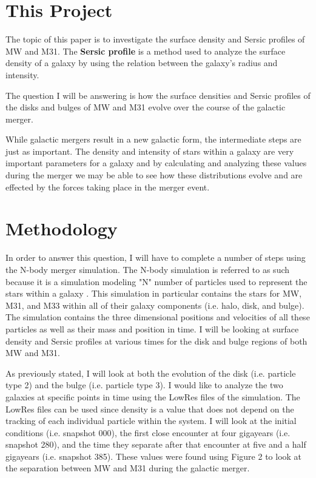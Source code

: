 \documentclass[linenumbers,trackchanges]{aastex7}
\begin{document}
\section{This Project} \label{sec:style}

The topic of this paper is to investigate the surface density and
Sersic profiles of MW and M31. The \textbf{Sersic profile} is a
method used to analyze the surface density of a galaxy by using the
relation between the galaxy's radius and intensity.

The question I will be answering is how the surface densities and
Sersic profiles of the disks and bulges of MW and M31 evolve over the
course of the galactic merger.

While galactic mergers result in a new galactic form, the intermediate
steps are just as important. The density and intensity of stars within
a galaxy are very important parameters for a galaxy and by calculating
and analyzing these values during the merger we may be able to see how
these distributions evolve and are effected by the forces taking place
in the merger event.

\section{Methodology} \label{sec:style}

In order to answer this question, I will have to complete a number of
steps using the N-body merger simulation. The N-body simulation is
referred to as such because it is a simulation modeling "N" number of
particles used to represent the stars within a galaxy
\citep{van_der_Marel_Besla_Cox_Sohn_Anderson_2012}. This simulation in
particular contains the stars for MW, M31, and M33 within all of their
galaxy components (i.e. halo, disk, and bulge). The simulation
contains the three dimensional positions and velocities of all these
particles as well as their mass and position in time. I will be
looking at surface density and Sersic profiles at various times for
the disk and bulge regions of both MW and M31.

As previously stated, I will look at both the evolution of the disk
(i.e. particle type 2) and the bulge (i.e. particle type 3). I would
like to analyze the two galaxies at specific points in time using the
LowRes files of the simulation. The LowRes files can be used since
density is a value that does not depend on the tracking of each
individual particle within the system. I will look at the initial
conditions (i.e. snapshot 000), the first close encounter at four
gigayears (i.e. snapshot 280), and the time they separate after that
encounter at five and a half gigayears (i.e. snapshot 385). These
values were found using Figure 2 to look at the separation between MW
and M31 during the galactic merger.
\end{document}
